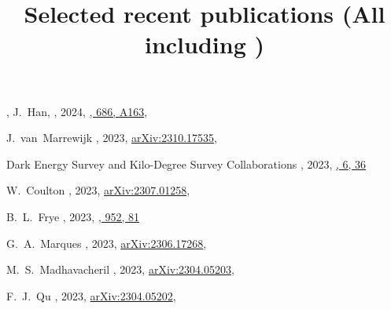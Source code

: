 
\title{Selected recent publications {\small (All including \myself)}}

\noindent


\begin{etaremune}

\item
\myself, J.~Han,
,
2024, \href{https://ui.adsabs.harvard.edu/abs/2024A&A...686A.163S/abstract}{\aap, 686, A163},
     
\item
J.~van~Marrewijk 
,
2023, \href{https://ui.adsabs.harvard.edu/abs/2023arXiv231006120V/abstract}{arXiv:2310.17535},
\submitted{\aap}

\item
Dark Energy Survey and Kilo-Degree Survey Collaborations 
,
2023, \href{https://ui.adsabs.harvard.edu/abs/2023OJAp....6E..36A/abstract}{\oja, 6, 36}

\item
W.~Coulton 
,
2023, \href{https://ui.adsabs.harvard.edu/abs/2023arXiv230701258C/abstract}{arXiv:2307.01258},
\submitted{\prd}

\item
B.~L.~Frye 
,
2023, \href{https://ui.adsabs.harvard.edu/abs/2023ApJ...952...81F/abstract}{\apj, 952, 81}

\item
G.~A.~Marques 
,
2023, \href{https://ui.adsabs.harvard.edu/abs/2023arXiv230617268M/abstract}{arXiv:2306.17268},
\accepted{\jcap}

\item
M.~S.~Madhavacheril 
,
2023, \href{https://ui.adsabs.harvard.edu/abs/2023arXiv230405203M/abstract}{arXiv:2304.05203},
\accepted{\apj}

\item
F.~J.~Qu 
,
2023, \href{https://ui.adsabs.harvard.edu/abs/2023arXiv230405202Q/abstract}{arXiv:2304.05202},
\accepted{\apj}


\end{etaremune}
